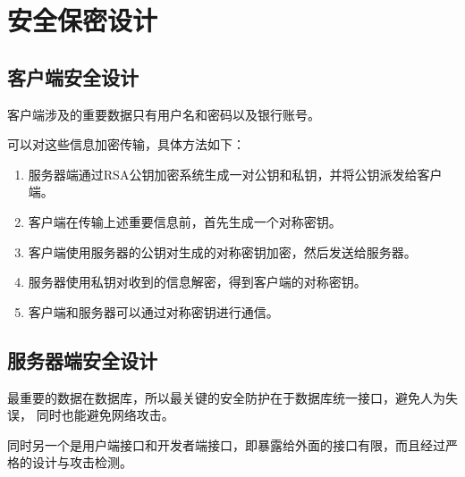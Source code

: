 \chapter{安全保密设计}
\section{客户端安全设计}
客户端涉及的重要数据只有用户名和密码以及银行账号。

可以对这些信息加密传输，具体方法如下：

\begin{enumerate}
\item 服务器端通过RSA公钥加密系统生成一对公钥和私钥，并将公钥派发给客户端。
\item 客户端在传输上述重要信息前，首先生成一个对称密钥。
\item 客户端使用服务器的公钥对生成的对称密钥加密，然后发送给服务器。
\item 服务器使用私钥对收到的信息解密，得到客户端的对称密钥。
\item 客户端和服务器可以通过对称密钥进行通信。
\end{enumerate}

\section{服务器端安全设计}
最重要的数据在数据库，所以最关键的安全防护在于数据库统一接口，避免人为失误，
同时也能避免网络攻击。

同时另一个是用户端接口和开发者端接口，即暴露给外面的接口有限，而且经过严格的设计与攻击检测。